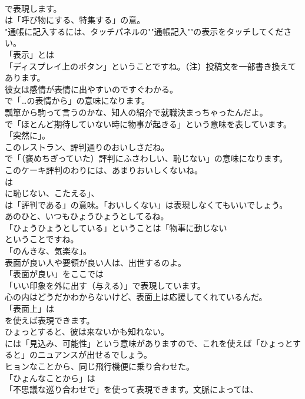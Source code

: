\documentclass[8pt]{extreport}
\begin{document}
\begin{CJK}{UTF8}{min}
\\	で表現します。
\\	は「呼び物にする、特集する」の意。	
\\	"通帳に記入するには、タッチパネルの""通帳記入""の表示をタッチしてください。 
\\	「表示」とは
\\	「ディスプレイ上のボタン」ということですね。（注）投稿文を一部書き換えてあります。
\\	彼女は感情が表情に出やすいのですぐわかる。 
\\	で「…の表情から」の意味になります。	
\\	瓢箪から駒って言うのかな、知人の紹介で就職決まっちゃったんだよ。 
\\	で「ほとんど期待していない時に物事が起きる」という意味を表しています。
\\	「突然に」。	
\\	このレストラン、評判通りのおいしさだね。 
\\	で「（褒めちぎっていた）評判にふさわしい、恥じない」の意味になります。	
\\	このケーキ評判のわりには、あまりおいしくないね。 
\\	は
\\	に恥じない、こたえる」、
\\	は「評判である」の意味。「おいしくない」は表現しなくてもいいでしょう。	
\\	あのひと、いつもひょうひょうとしてるね。 
\\	「ひょうひょうとしている」ということは「物事に動じない
\\	ということですね。
\\	「のんきな、気楽な」。	
\\	表面が良い人や要領が良い人は、出世するのよ。 
\\	「表面が良い」をここでは
\\	「いい印象を外に出す（与える）」で表現しています。	
\\	心の内はどうだかわからないけど、表面上は応援してくれているんだ。 
\\	「表面上」は
\\	を使えば表現できます。	
\\	ひょっとすると、彼は来ないかも知れない。 
\\	には「見込み、可能性」という意味がありますので、これを使えば「ひょっとすると」のニュアンスが出せるでしょう。	
\\	ヒョンなことから、同じ飛行機便に乗り合わせた。 
\\	「ひょんなことから」は
\\	「不思議な巡り合わせで」を使って表現できます。文脈によっては、

\end{CJK}
\end{document}
